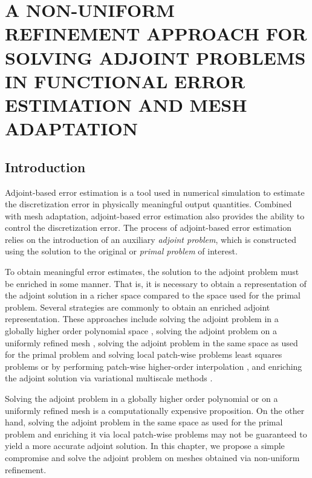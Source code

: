 \chapter{A NON-UNIFORM REFINEMENT APPROACH
FOR SOLVING ADJOINT PROBLEMS IN FUNCTIONAL
ERROR ESTIMATION AND MESH ADAPTATION}
\label{chap:refine}

\section{Introduction}

Adjoint-based error estimation
\cite{becker2001optimal, giles2003adjoint,
pierce2004adjoint, venditti2000adjoint,
venditti2002adjoint,
venditti2003adjoint,
prudhomme1999goal,
prudhomme2003practical,
fidkowski2011review,
connors2013method}
is a tool used in numerical simulation
to estimate the discretization error
in physically meaningful output quantities.
Combined with mesh adaptation, adjoint-based error
estimation also provides the ability to control the discretization
error. The process of adjoint-based error estimation
relies on the introduction of an auxiliary
\emph{adjoint problem}, which is constructed using
the solution to the original or \emph{primal problem}
of interest.

To obtain meaningful error estimates,
the solution to the adjoint problem must be
enriched in some manner. That is, it is
necessary to obtain a representation of the
adjoint solution in a richer space compared
to the space used for the primal problem.
Several strategies are commonly
to obtain an enriched adjoint representation.
These approaches include
solving the adjoint problem in a globally higher
order polynomial space
\cite{fidkowski2011output},
solving the adjoint problem on a uniformly
refined mesh \cite{burstedde2009parallel},
solving the adjoint problem in the same space
as used for the primal problem
and solving local patch-wise problems least
squares problems \cite{nemec2007adjoint} or
by performing patch-wise higher-order interpolation
\cite{becker2001optimal},
and enriching the adjoint solution via
variational multiscale methods
\cite{granzow2017output}.

Solving the adjoint problem in a globally higher
order polynomial or on a uniformly refined mesh
is a computationally expensive proposition. On the
other hand, solving the adjoint problem in the same
space as used for the primal problem and enriching
it via local patch-wise problems may not be guaranteed
to yield a more accurate adjoint solution. In this
chapter, we propose a simple compromise and solve the
adjoint problem on meshes obtained via non-uniform
refinement.

